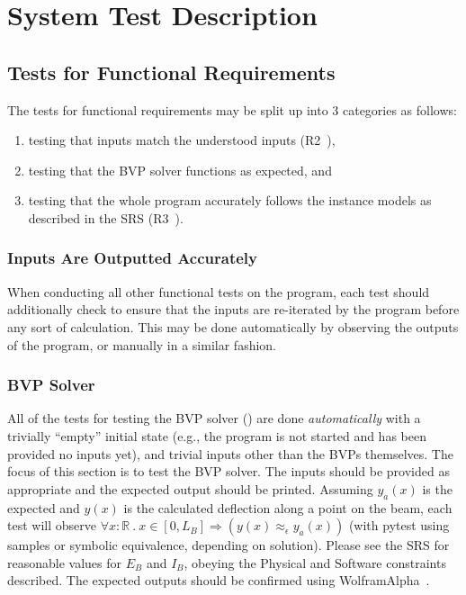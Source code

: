 \documentclass[12pt, titlepage]{article}
\begin{document}
\section{System Test Description}

\subsection{Tests for Functional Requirements}

The tests for functional requirements may be split up into 3 categories as
follows:

\begin{enumerate}

    \item testing that inputs match the understood inputs
          (R2~\cite{BalaciBeamBendingSRS2023}),

    \item testing that the BVP solver functions as expected, and

    \item testing that the whole program accurately follows the instance models
          as described in the SRS (R3~\cite{BalaciBeamBendingSRS2023}).

\end{enumerate}

\subsubsection{Inputs Are Outputted Accurately}

When conducting all other functional tests on the program, each test should
additionally check to ensure that the inputs are re-iterated by the program
before any sort of calculation. This may be done automatically by observing the
outputs of the program, or manually in a similar fashion.

\subsubsection{BVP Solver}

All of the tests for testing the BVP solver ()
are done \textit{automatically} with a trivially ``empty'' initial state (e.g.,
the program is not started and has been provided no inputs yet), and trivial
inputs other than the BVPs themselves. The focus of this section is to test the
BVP solver. The inputs should be provided as appropriate and the expected output
should be printed. Assuming \(y_a(x)\) is the expected and \(y(x)\) is the
calculated deflection along a point on the beam, each test will observe
\(\forall x : \mathbb{R} ~.~x \in [0, L_B] \Rightarrow (y(x) \approx_{\epsilon}
y_a(x))\) (with pytest using samples or symbolic equivalence, depending on
solution). Please see the SRS for reasonable values for $E_B$ and $I_B$, obeying
the Physical and Software constraints described. The expected outputs should be
confirmed using WolframAlpha~\cite{WolframAlpha}.
\end{document}
